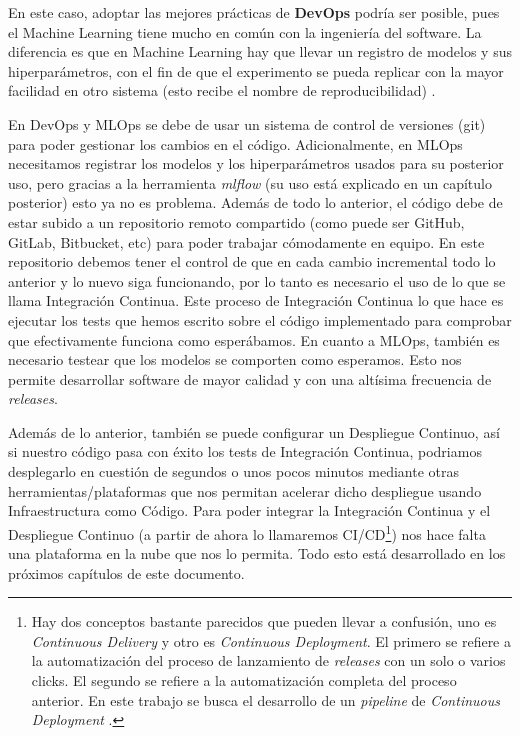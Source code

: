 En este caso, adoptar las mejores prácticas de \textbf{DevOps} podría ser posible, pues el Machine Learning tiene mucho en común con la ingeniería del software. La diferencia es que en Machine Learning hay que llevar un registro de modelos y sus hiperparámetros, con el fin de que el experimento se pueda replicar con la mayor facilidad en otro sistema (esto recibe el nombre de reproducibilidad) \cite{whymlops}.\newline

En DevOps y MLOps se debe de usar un sistema de control de versiones (git) para poder gestionar los cambios en el código. Adicionalmente, en MLOps necesitamos registrar los modelos y los hiperparámetros usados para su posterior uso, pero gracias a la herramienta \textit{mlflow} (su uso está explicado en un capítulo posterior) esto ya no es problema. Además de todo lo anterior, el código debe de estar subido a un repositorio remoto compartido (como puede ser GitHub, GitLab, Bitbucket, etc) para poder trabajar cómodamente en equipo. En este repositorio debemos tener el control de que en cada cambio incremental todo lo anterior y lo nuevo siga funcionando, por lo tanto es necesario el uso de lo que se llama Integración Continua. Este proceso de Integración Continua lo que hace es ejecutar los tests que hemos escrito sobre el código implementado para comprobar que efectivamente funciona como esperábamos. En cuanto a MLOps, también es necesario testear que los modelos se comporten como esperamos. Esto nos permite desarrollar software de mayor calidad y con una altísima frecuencia de \textit{releases}.\newline

Además de lo anterior, también se puede configurar un Despliegue Continuo, así si nuestro código pasa con éxito los tests de Integración Continua, podriamos desplegarlo en cuestión de segundos o unos pocos minutos mediante otras herramientas/plataformas que nos permitan acelerar dicho despliegue usando Infraestructura como Código. Para poder integrar la Integración Continua y el Despliegue Continuo (a partir de ahora lo llamaremos CI/CD\footnote{Hay dos conceptos bastante parecidos que pueden llevar a confusión, uno es \textit{Continuous Delivery} y otro es \textit{Continuous Deployment}. El primero se refiere a la automatización del proceso de lanzamiento de \textit{releases} con un solo o varios clicks. El segundo se refiere a la automatización completa del proceso anterior. En este trabajo se busca el desarrollo de un \textit{pipeline} de \textit{Continuous Deployment} \cite{continuous_delivery_deployment}.}) nos hace falta una plataforma en la nube que nos lo permita. Todo esto está desarrollado en los próximos capítulos de este documento.

